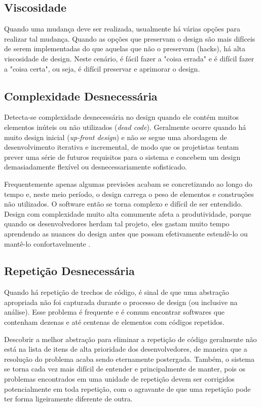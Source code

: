 \subsection{Viscosidade}

Quando uma mudança deve ser realizada, usualmente há várias opções para realizar
tal mudança. Quando as opções que preservam o design são mais difíceis de serem
implementadas do que aquelas que não o preservam (hacks), há alta viscosidade 
de design. Neste cenário, é fácil fazer a "coisa errada" e é difícil fazer a
"coisa certa", ou seja, é difícil preservar e aprimorar o design.

\subsection{Complexidade Desnecessária}

Detecta-se complexidade desnecessária no design quando ele contém muitos 
elementos inúteis ou não utilizados (\textit{dead code}). Geralmente ocorre
quando há muito design inicial (\textit{up-front design}) e não se segue uma 
abordagem de desenvolvimento iterativa e incremental, de modo que os projetistas
tentam prever uma série de futuros requisitos para o sistema e concebem um 
design demasiadamente flexível ou desnecessariamente sofisticado. 

Frequentemente apenas algumas previsões acabam se concretizando ao longo do
tempo e, neste meio período, o design carrega o peso de elementos e construções 
não utilizados. O software então se torna complexo e difícil de ser entendido. 
Design com complexidade muito alta comumente afeta a produtividade, porque 
quando os desenvolvedores herdam tal projeto, eles gastam muito tempo 
aprendendo as nuances do design antes que possam efetivamente  estendê-lo ou
mantê-lo confortavelmente \cite{kerievsky}.

\subsection{Repetição Desnecessária}

Quando há repetição de trechos de código, é sinal de que uma abstração
apropriada não foi capturada durante o processo de design (ou inclusive na
análise). Esse problema é frequente e é comum encontrar softwares que contenham 
dezenas e até centenas de elementos com códigos repetidos. 

Descobrir a melhor abstração para eliminar a repetição de código geralmente não 
está na lista de itens de alta prioridade dos desenvolvedores, de maneira que a 
resolução do problema acaba sendo eternamente postergada. Também, o sistema se
torna cada vez mais difícil de entender e principalmente de manter, pois os 
problemas encontrados em uma unidade de repetição devem ser corrigidos
potencialmente  em toda repetição, com o agravante de que uma repetição pode
ter forma ligeiramente diferente de outra.

